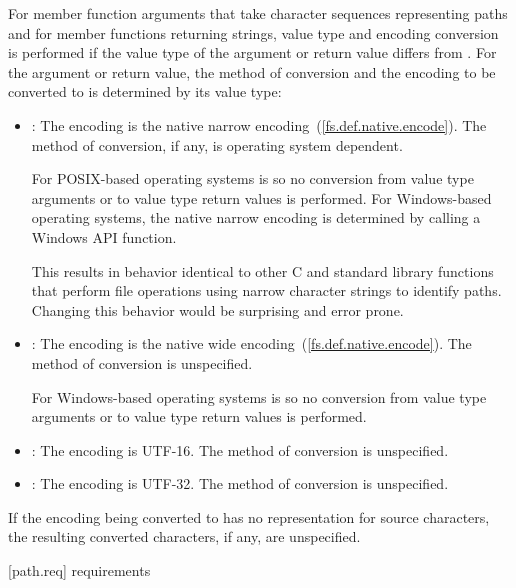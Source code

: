 \pnum
For member function arguments that take character sequences representing
paths and for member functions returning strings, value type and encoding
conversion is performed if the value type of the argument or return value differs from
.
For the argument or return value, the method of conversion and the encoding 
to be converted to is determined
by its value type:
\begin{itemize}
\item {}: The encoding is the native narrow encoding~(\ref{fs.def.native.encode}).
The method of conversion, if any, is operating system dependent.
\begin{note}
For POSIX-based operating systems  is 
so no conversion from  value type arguments or to 
value type return values is performed.
For Windows-based operating systems, the
native narrow encoding is determined by calling a Windows API function.
\end{note}
\begin{note}
This results in behavior identical to other C and \Cpp
standard library functions that perform file operations using narrow character
strings to identify paths. Changing this behavior would be surprising and error
prone.
\end{note}
\item {}: The encoding is the native wide encoding~(\ref{fs.def.native.encode}).
The method of conversion is unspecified.
\begin{note}
For Windows-based operating systems  is 
so no conversion from  value type arguments or to 
value type return values is performed.
\end{note}
\item {}: The encoding is UTF-16. The method of conversion
is unspecified.
\item {}: The encoding is UTF-32. The method of conversion
is unspecified.
\end{itemize}

\pnum
If the encoding being converted to has no representation for source
characters, the resulting converted characters, if any, are unspecified.

[path.req]{ requirements}


